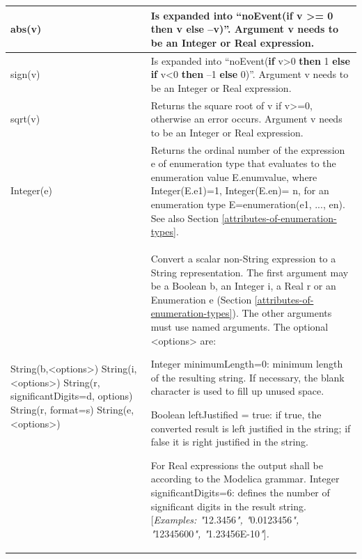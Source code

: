 \documentclass[10pt,a4paper]{report}
\begin{document}
\begin{longtable}{|p{3.5cm}|p{8cm}|}
\hline
abs(v) & Is expanded into ``noEvent(\textbf{if} v \textgreater{}= 0
\textbf{then} v \textbf{else} --v)''. Argument v needs to be an Integer
or Real expression.\\ \hline
sign(v) & Is expanded into ``noEvent(\textbf{if} v\textgreater{}0
\textbf{then} 1 \textbf{else if} v\textless{}0 \textbf{then} --1
\textbf{else} 0)''. Argument v needs to be an Integer or Real
expression.\\ \hline
sqrt(v) & Returns the square root of v if v\textgreater{}=0, otherwise
an error occurs. Argument v needs to be an Integer or Real
expression.\\ \hline
Integer(e) & Returns the ordinal number of the expression e of
enumeration type that evaluates to the enumeration value E.enumvalue,
where Integer(E.e1)=1, Integer(E.en)= n, for an enumeration type
E=enumeration(e1, ..., en). See also Section \ref{attributes-of-enumeration-types}.\\ \hline
String(b,\textless{}options\textgreater{})\linebreak
String(i,\textless{}options\textgreater{})\linebreak
String(r,\linebreak \hspace*{2mm} significantDigits=d,\linebreak \hspace*{2mm} options)\linebreak
String(r, format=s)\linebreak
String(e, \textless{}options\textgreater{})\linebreak &
Convert a scalar non-String expression to a String representation. The
first argument may be a Boolean b, an Integer i, a Real r or an
Enumeration e (Section \ref{attributes-of-enumeration-types}). The other arguments must use named arguments. The optional
\textless{}options\textgreater{} are:

Integer minimumLength=0: minimum length of the resulting string. If
necessary, the blank character is used to fill up unused space.

Boolean leftJustified = true: if true, the converted result is left
justified in the string; if false it is right justified in the string.

For Real expressions the output shall be according to the Modelica
grammar. Integer significantDigits=6: defines the number of significant
digits in the result string. {[}\emph{Examples: "}12.3456\emph{",
"}0.0123456\emph{", "}12345600\emph{", "}1.23456E-10\emph{"}{]}\emph{.}


\end{longtable}
\end{document}
